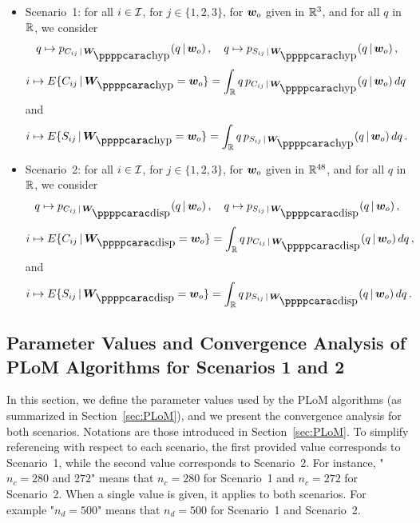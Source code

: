 \begin{itemize}
%
\item Scenario~1: for all $i\in {\mathcal{I}}$, for  $j\in\{1,2,3\}$, for  ${\boldsymbol{w}}_o$ given in ${\mathbb{R}}^3$, and for all $q$ in ${\mathbb{R}}$, we consider
\begin{equation*} 
q\mapsto p_{C_{ij} \, \vert \,\bfW_\hypp}(q \, \vert \, \bfw_o)\,, \quad 
q\mapsto p_{S_{ij} \, \vert \,\bfW_\hypp}(q \, \vert \, \bfw_o)\, ,                                                         \nonumber 
\end{equation*}
\begin{equation*} 
i\mapsto E\{C_{ij} \, \vert \,\bfW_\hypp = \bfw_o \} = \int_\RR q\, p_{C_{ij} \, \vert \,\bfW_\hypp}(q \, \vert \, \bfw_o) \, dq \,
\end{equation*}
and
\begin{equation*}
i\mapsto E\{S_{ij} \, \vert \,\bfW_\hypp = \bfw_o \} = \int_\RR q\, p_{S_{ij} \, \vert \,\bfW_\hypp}(q \, \vert \, \bfw_o) \, dq\, .
\end{equation*}
%
\item Scenario~2: for all $i \in {\mathcal{I}}$, for  $j\in\{1,2,3\}$, for  ${\boldsymbol{w}}_o$ given in ${\mathbb{R}}^{48}$, and for all $q$ in ${\mathbb{R}}$, we consider
\begin{equation*}
q\mapsto p_{C_{ij} \, \vert \,\bfW_\dispp}(q \, \vert \, \bfw_o)\,, \quad q\mapsto p_{S_{ij} \, \vert \,\bfW_\dispp}(q \, \vert \, \bfw_o)\, ,
\end{equation*}
\begin{equation*}
i\mapsto E\{C_{ij} \, \vert \,\bfW_\dispp = \bfw_o \} = \int_\RR q\, p_{C_{ij} \, \vert \,\bfW_\dispp}(q \, \vert \, \bfw_o) \, dq\,,
\end{equation*}
and
\begin{equation*}
i\mapsto E\{S_{ij} \, \vert \,\bfW_\dispp = \bfw_o \} = \int_\RR q\, p_{S_{ij} \, \vert \,\bfW_\dispp}(q \, \vert \, \bfw_o) \, dq\, .
\end{equation*}
%
\end{itemize}
 
\subsection{Parameter Values and Convergence Analysis of PLoM Algorithms for Scenarios 1 and 2}
\label{sec:PLoMappli.3}
%
In this section, we define the parameter values used by the PLoM algorithms (as summarized in Section~\ref{sec:PLoM}), and we present the convergence analysis for both scenarios. Notations are those introduced in Section~\ref{sec:PLoM}.
%
To simplify referencing with respect to each scenario, the first provided value corresponds to Scenario~1, while the second value corresponds to Scenario~2. For instance, "$n_c=280$ and $272$" means that $n_c=280$ for Scenario~1 and $n_c=272$ for Scenario~2. When a single value is given, it applies to both scenarios. For example "$n_d=500$" means that $n_d=500$ for Scenario~1 and Scenario~2.\\

